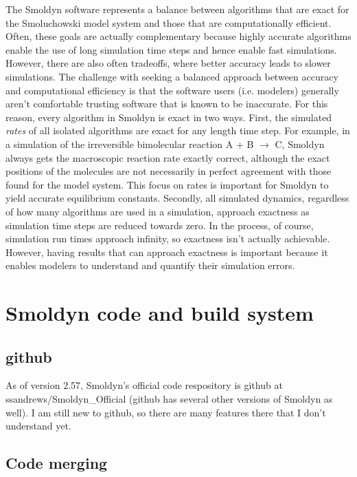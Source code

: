 \documentclass {book}
\begin{document}
The Smoldyn software represents a balance between algorithms that are exact for the Smoluchowski model system and those that are computationally efficient.  Often, these goals are actually complementary because highly accurate algorithms enable the use of long simulation time steps and hence enable fast simulations.  However, there are also often tradeoffs, where better accuracy leads to slower simulations.  The challenge with seeking a balanced approach between accuracy and computational efficiency is that the software users (i.e. modelers) generally aren't comfortable trusting software that is known to be inaccurate.  For this reason, every algorithm in Smoldyn is exact in two ways.  First, the simulated \emph{rates} of all isolated algorithms are exact for any length time step.  For example, in a simulation of the irreversible bimolecular reaction A + B $\rightarrow$ C, Smoldyn always gets the macroscopic reaction rate exactly correct, although the exact positions of the molecules are not necessarily in perfect agreement with those found for the model system.  This focus on rates is important for Smoldyn to yield accurate equilibrium constants.  Secondly, all simulated dynamics, regardless of how many algorithms are used in a simulation, approach exactness as simulation time steps are reduced towards zero.  In the process, of course, simulation run times approach infinity, so exactness isn't actually achievable.  However, having results that can approach exactness is important because it enables modelers to understand and quantify their simulation errors.


\chapter{Smoldyn code and build system}

\section{github}

As of version 2.57, Smoldyn's official code respository is github at ssandrews/Smoldyn\_Official (github has several other versions of Smoldyn as well). I am still new to github, so there are many features there that I don't understand yet.

\section{Code merging}
\end{document}
